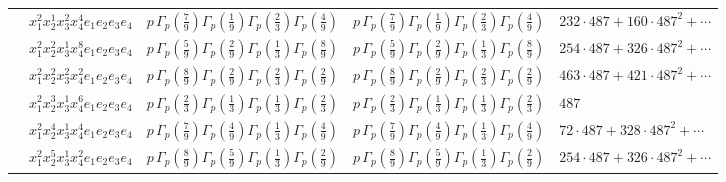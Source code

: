 \documentclass[11pt]{article}
\begin{document}
\begin{table}[ht]
{\begin{tabular}{@{}lllll@{}}
 & $x_{1}^{2} x_{2}^{1} x_{3}^{2} x_{4}^{4}  e_{1} e_{2} e_{3} e_{4}$ & $p \, \Gamma_p \left( \frac{7}{9} \right) \Gamma_p \left( \frac{1}{9} \right) \Gamma_p \left( \frac{2}{3} \right) \Gamma_p \left( \frac{4}{9} \right)$ & $p \, \Gamma_p \left( \frac{7}{9} \right) \Gamma_p \left( \frac{1}{9} \right) \Gamma_p \left( \frac{2}{3} \right) \Gamma_p \left( \frac{4}{9} \right)$ & $232{\cdot}487{+}160{\cdot}487^{2}{+}\cdots$ \\
 & $x_{1}^{2} x_{2}^{2} x_{3}^{1} x_{4}^{8}  e_{1} e_{2} e_{3} e_{4}$ & $p \, \Gamma_p \left( \frac{5}{9} \right) \Gamma_p \left( \frac{2}{9} \right) \Gamma_p \left( \frac{1}{3} \right) \Gamma_p \left( \frac{8}{9} \right)$ & $p \, \Gamma_p \left( \frac{5}{9} \right) \Gamma_p \left( \frac{2}{9} \right) \Gamma_p \left( \frac{1}{3} \right) \Gamma_p \left( \frac{8}{9} \right)$ & $254{\cdot}487{+}326{\cdot}487^{2}{+}\cdots$ \\
 & $x_{1}^{2} x_{2}^{2} x_{3}^{2} x_{4}^{2}  e_{1} e_{2} e_{3} e_{4}$ & $p \, \Gamma_p \left( \frac{8}{9} \right) \Gamma_p \left( \frac{2}{9} \right) \Gamma_p \left( \frac{2}{3} \right) \Gamma_p \left( \frac{2}{9} \right)$ & $p \, \Gamma_p \left( \frac{8}{9} \right) \Gamma_p \left( \frac{2}{9} \right) \Gamma_p \left( \frac{2}{3} \right) \Gamma_p \left( \frac{2}{9} \right)$ & $463{\cdot}487{+}421{\cdot}487^{2}{+}\cdots$ \\
 & $x_{1}^{2} x_{2}^{3} x_{3}^{1} x_{4}^{6}  e_{1} e_{2} e_{3} e_{4}$ & $p \, \Gamma_p \left( \frac{2}{3} \right) \Gamma_p \left( \frac{1}{3} \right) \Gamma_p \left( \frac{1}{3} \right) \Gamma_p \left( \frac{2}{3} \right)$ & $p \, \Gamma_p \left( \frac{2}{3} \right) \Gamma_p \left( \frac{1}{3} \right) \Gamma_p \left( \frac{1}{3} \right) \Gamma_p \left( \frac{2}{3} \right)$ & $487$ \\
 & $x_{1}^{2} x_{2}^{4} x_{3}^{1} x_{4}^{4}  e_{1} e_{2} e_{3} e_{4}$ & $p \, \Gamma_p \left( \frac{7}{9} \right) \Gamma_p \left( \frac{4}{9} \right) \Gamma_p \left( \frac{1}{3} \right) \Gamma_p \left( \frac{4}{9} \right)$ & $p \, \Gamma_p \left( \frac{7}{9} \right) \Gamma_p \left( \frac{4}{9} \right) \Gamma_p \left( \frac{1}{3} \right) \Gamma_p \left( \frac{4}{9} \right)$ & $72{\cdot}487{+}328{\cdot}487^{2}{+}\cdots$ \\
 & $x_{1}^{2} x_{2}^{5} x_{3}^{1} x_{4}^{2}  e_{1} e_{2} e_{3} e_{4}$ & $p \, \Gamma_p \left( \frac{8}{9} \right) \Gamma_p \left( \frac{5}{9} \right) \Gamma_p \left( \frac{1}{3} \right) \Gamma_p \left( \frac{2}{9} \right)$ & $p \, \Gamma_p \left( \frac{8}{9} \right) \Gamma_p \left( \frac{5}{9} \right) \Gamma_p \left( \frac{1}{3} \right) \Gamma_p \left( \frac{2}{9} \right)$ & $254{\cdot}487{+}326{\cdot}487^{2}{+}\cdots$ \\

\end{tabular}}
\end{table}
\end{document}
